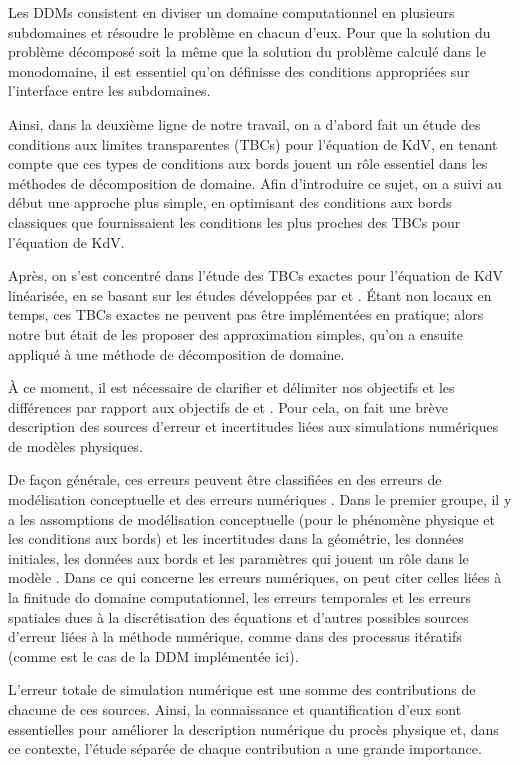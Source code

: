 \indent Les DDMs consistent en diviser un domaine computationnel en plusieurs subdomaines et résoudre le problème en chacun d'eux. Pour que la solution du problème décomposé soit la même que la solution du problème calculé dans le monodomaine, il est essentiel qu'on définisse des conditions appropriées sur l'interface entre les subdomaines.

\indent Ainsi, dans la deuxième ligne de notre travail, on a d'abord fait un étude des conditions aux limites transparentes (TBCs) pour l'équation de KdV, en tenant compte que ces types de conditions aux bords jouent un rôle essentiel dans les méthodes de décomposition de domaine. Afin d'introduire ce sujet, on a suivi au début une approche plus simple, en optimisant des conditions aux bords classiques que fournissaient les conditions les plus proches des TBCs pour l'équation de KdV.

\indent Après, on s'est concentré dans l'étude des TBCs exactes pour l'équation de KdV linéarisée, en se basant sur les études développées par \cite{zheng2008} et \cite{besse2015}. Étant non locaux en temps, ces TBCs exactes ne peuvent pas être implémentées en pratique; alors notre but était de les proposer des approximation simples, qu'on a ensuite appliqué à une méthode de décomposition de domaine.

\indent À ce moment, il est nécessaire de clarifier et délimiter nos objectifs et les différences par rapport aux objectifs de \cite{zheng2008} et \cite{besse2015}. Pour cela, on fait une brève description des sources d'erreur et incertitudes liées aux simulations numériques de modèles physiques.

\indent De façon générale, ces erreurs peuvent être classifiées en des erreurs de modélisation conceptuelle et des erreurs numériques \cite{roache1997}. Dans le premier groupe, il y a les assomptions de modélisation conceptuelle (pour le phénomène physique et les conditions aux bords) et les incertitudes dans la géométrie, les données initiales, les données aux bords et les paramètres qui jouent un rôle dans le modèle \cite{roache1997,balagurusamy2008}. Dans ce qui concerne les erreurs numériques, on peut citer celles liées à la finitude do domaine computationnel, les erreurs temporales et les erreurs spatiales dues à la discrétisation des équations \cite{karniadakis1995,roache1997} et d'autres possibles sources d'erreur liées à la méthode numérique, comme dans des processus itératifs (comme est le cas de la DDM implémentée ici).

\indent L'erreur totale de simulation numérique est une somme des contributions de chacune de ces sources. Ainsi, la connaissance et quantification d'eux sont essentielles pour améliorer la description numérique du procès physique et, dans ce contexte, l'étude séparée de chaque contribution a une grande importance.

